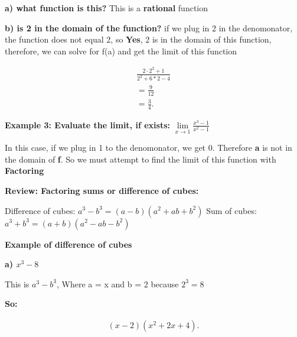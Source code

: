 \documentclass{report}
\begin{document}
    \bigbreak \noindent \bigbreak \noindent 
    \textbf{a) what function is this?}
    \noindent This is a \textbf{rational} function 


    \bigbreak \noindent \bigbreak \noindent  
    \textbf{b) is 2 in the domain of the function?}
    \noindent if we plug in 2 in the denomonator, the function does not equal 2, 
    so \textbf{Yes}, 2 is in the domain of this function, therefore, we can solve for f(a)
    and get the limit of this function

    \begin{align*}
        \frac{2 \cdot 2^2+1}{2^2+6*2-4} \\
        = \frac{9}{12} \\
        = \frac{3}{4}
    .\end{align*}

    \bigbreak \noindent 
    \begin{large}
       \textbf{Example 3: Evaluate the limit, if exists:} 
        \bigbreak \noindent 
        $\lim\limits_{x \to 1}{ \frac{x^3-1}{x^2-1}}$
    \end{large}
    
   \noindent In this case, if we plug in 1 to the denomonator, we get 0. Therefore \textbf{a} is not in the domain of \textbf{f}. 
   So we must attempt to find the limit of this function with \textbf{Factoring}

   \pagebreak
   \begin{large}
      \noindent \textbf{Review: Factoring sums or difference of cubes:} 
   \end{large}

   \bigbreak \noindent \bigbreak \noindent 
   Difference of cubes: $a^3-b^3 = \left(a-b\right) \left(a^2+ab+b^2\right)$ 
   \bigbreak \noindent 
   Sum of cubes: $a^3+b^3 = \left(a+b\right) \left(a^2-ab-b^2\right)$

   \bigbreak \noindent \bigbreak \noindent 
   \begin{large}
      \noindent \textbf{Example of difference of cubes} 
   \end{large}
    
   \bigbreak \noindent 
   \textbf{a) $x^3-8$}

    \bigbreak \noindent 
    This is \textbf{$a^3-b^3$}, Where a = x and b = 2 because $2^3 = 8$

    \bigbreak \noindent 
    \textbf{So:}
 
    \begin{align*}
        \left(x-2\right) \left(x^2+2x+4\right)
    .\end{align*}
    
\end{document}
